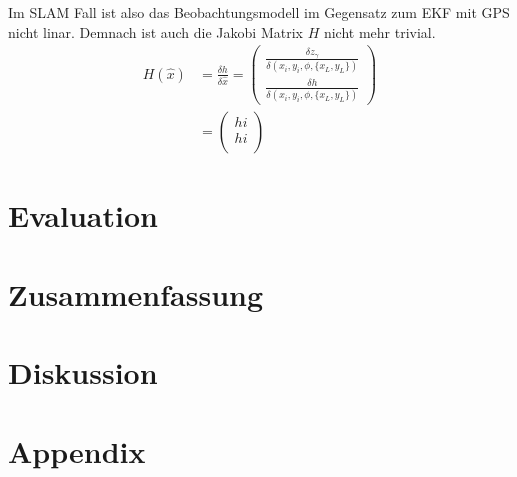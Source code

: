 \documentclass[11pt]{article}
\begin{document}
Im SLAM Fall ist also das Beobachtungsmodell im Gegensatz zum EKF mit GPS nicht linar. Demnach ist auch die Jakobi Matrix $H$ nicht mehr trivial.
\begin{equation}\label{SLAM-Jakobi-Matrix}
\begin{split}
	H(\hat{x}) &= \frac{\delta h}{\delta \hat{x}} = \begin{pmatrix}
		\frac{\delta z_\gamma}{\delta (x_i, y_i, \phi, \{x_L, y_L\})} \\
		\frac{\delta h}{\delta (x_i, y_i, \phi, \{x_L, y_L\})}
	\end{pmatrix} \\
	&= \begin{pmatrix}
		hi \\
		hi\\
	\end{pmatrix}
\end{split}
\end{equation}

\section{Evaluation}

\section{Zusammenfassung}\label{Zusammenfassung}

\section{Diskussion}\label{Diskussion}

\section{Appendix}\label{Appendix}




\end{document}
